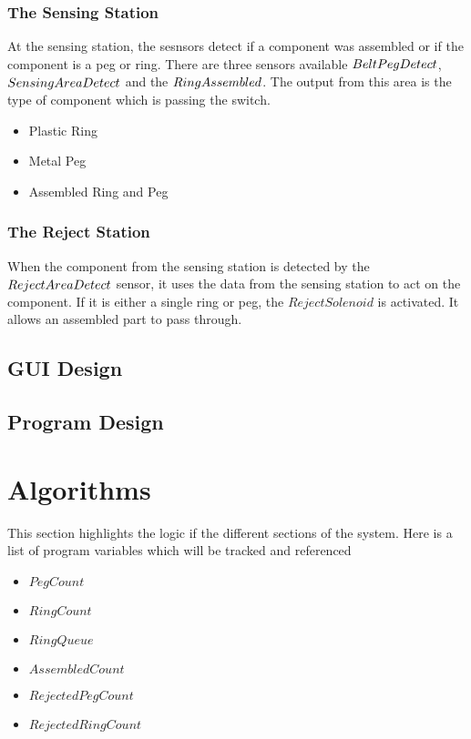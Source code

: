 \documentclass[12pt]{article}
\begin{document}
    \subsubsection{The Sensing Station}
      At the sensing station, the sesnsors detect if a com\-ponent was ass\-embled or if the
      com\-ponent is a peg or ring. There are three sensors available $Belt\-Peg\-Detect$, 
      $Sensing\-Area\-Detect$ and the $Ring\-Assembled$. The output from this area is the type
      of component which is passing the switch.
      \begin{itemize}
        \item Plastic Ring
        \item Metal Peg
        \item Assembled Ring and Peg
      \end{itemize}

    \subsubsection{The Reject Station}
      When the component from the sensing station is detected by the $Reject\-Area\-Detect$
      sensor, it uses the data from the sensing station to act on the component. If it
      is either a single ring or peg, the $RejectSolenoid$ is activated. It allows an
      assembled part to pass through.

  \subsection{GUI Design}
  \subsection{Program Design}
\section{Algorithms}
  This section highlights the logic if the different sections of the system.
  Here is a list of program variables which will be tracked and referenced
  \begin{itemize}
    \item $PegCount$
    \item $RingCount$
    \item $RingQueue$
    \item $AssembledCount$
    \item $RejectedPegCount$
    \item $RejectedRingCount$
  \end{itemize}
\end{document}
